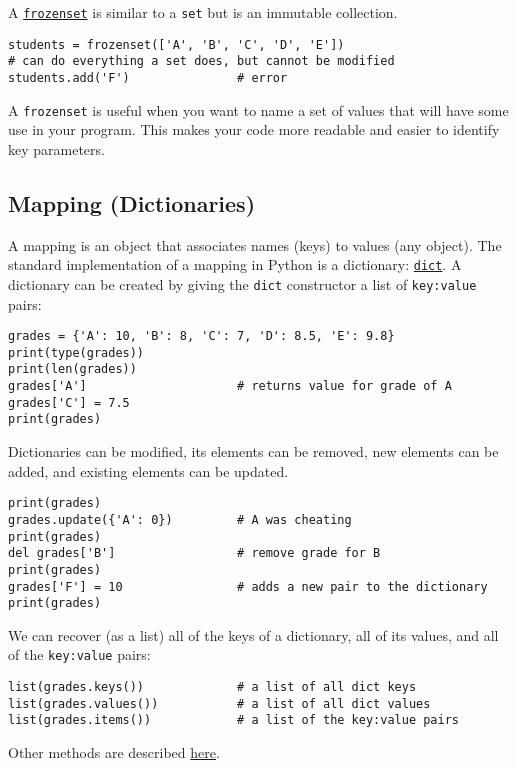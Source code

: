 \documentclass[12pt, a4paper]{article}
\begin{document}
A \href{https://docs.python.org/3.6/library/stdtypes.html\#frozenset}{\texttt{frozenset}} is similar to a \texttt{set} but is an immutable collection.
\lstset{language=jupyter-python,label= ,caption= ,captionpos=b,numbers=none}
\begin{lstlisting}
students = frozenset(['A', 'B', 'C', 'D', 'E'])
# can do everything a set does, but cannot be modified
students.add('F')               # error
\end{lstlisting}
A \texttt{frozenset} is useful when you want to name a set of values that will have some use in your program.
This makes your code more readable and easier to identify key parameters.
\subsection{Mapping (Dictionaries)}
\label{sec:org8043729}
A mapping is an object that associates names (keys) to values (any object).
The standard implementation of a mapping in Python is a dictionary: \href{https://docs.python.org/3.6/library/stdtypes.html\#dict}{\texttt{dict}}.
A dictionary can be created by giving the \texttt{dict} constructor a list of \texttt{key:value} pairs:
\lstset{language=jupyter-python,label= ,caption= ,captionpos=b,numbers=none}
\begin{lstlisting}
grades = {'A': 10, 'B': 8, 'C': 7, 'D': 8.5, 'E': 9.8}
print(type(grades))
print(len(grades))
grades['A']                     # returns value for grade of A
grades['C'] = 7.5
print(grades)
\end{lstlisting}

Dictionaries can be modified, its elements can be removed, new elements can be added, and existing elements can be updated.
\lstset{language=jupyter-python,label= ,caption= ,captionpos=b,numbers=none}
\begin{lstlisting}
print(grades)
grades.update({'A': 0})         # A was cheating
print(grades)
del grades['B']                 # remove grade for B
print(grades)
grades['F'] = 10                # adds a new pair to the dictionary
print(grades)
\end{lstlisting}

We can recover (as a list) all of the keys of a dictionary, all of its values, and all of the \texttt{key:value} pairs:
\lstset{language=jupyter-python,label= ,caption= ,captionpos=b,numbers=none}
\begin{lstlisting}
list(grades.keys())             # a list of all dict keys
list(grades.values())           # a list of all dict values
list(grades.items())            # a list of the key:value pairs
\end{lstlisting}
Other methods are described \href{https://docs.python.org/3.6/library/stdtypes.html\#dict}{here}.
\end{document}
